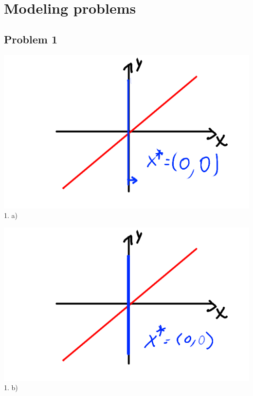 \section{Modeling problems}

\subsection{Problem 1}
\begin{minipage}{0.45\textwidth}
\includegraphics[width=\textwidth]{fig/model/1a.png}
1. a)
\end{minipage}
\hfill
\begin{minipage}{0.45\textwidth}
\includegraphics[width=\textwidth]{fig/model/1b.png}
1. b)
\end{minipage}

